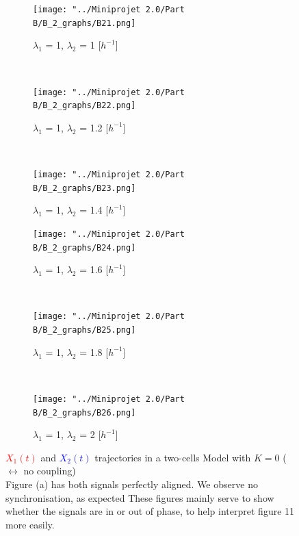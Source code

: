 \documentclass[10pt,a4paper,oneside,twocolumn]{article}
\newcommand{\red}[1]{\textcolor{red}{#1}}
\newcommand{\blue}[1]{\textcolor{blue}{#1}}
\numberwithin{equation}{section} %
\begin{document}
    \begin{figure}
    \centering
	\begin{subfigure}[b]{0.32\textwidth}
	    \texttt{[image: "../Miniprojet 2.0/Part B/B\_2\_graphs/B21.png]}
	    \caption{$\lambda_1$ = 1, $\lambda_2$ = 1 [$h^{-1}$]}
	\end{subfigure}
	~ 
	\begin{subfigure}[b]{0.32\textwidth}
	    \texttt{[image: "../Miniprojet 2.0/Part B/B\_2\_graphs/B22.png]}
	    \caption{$\lambda_1$ = 1, $\lambda_2$ = 1.2 [$h^{-1}$]}
	\end{subfigure}
	~ 
	\begin{subfigure}[b]{0.32\textwidth}
	    \texttt{[image: "../Miniprojet 2.0/Part B/B\_2\_graphs/B23.png]}
	    \caption{$\lambda_1$ = 1, $\lambda_2$ = 1.4 [$h^{-1}$]}
	\end{subfigure}
	 
	\begin{subfigure}[b]{0.32\textwidth}
	    \texttt{[image: "../Miniprojet 2.0/Part B/B\_2\_graphs/B24.png]}
	    \caption{$\lambda_1$ = 1, $\lambda_2$ = 1.6 [$h^{-1}$]}
	\end{subfigure}
	~ 
	\begin{subfigure}[b]{0.32\textwidth}
	    \texttt{[image: "../Miniprojet 2.0/Part B/B\_2\_graphs/B25.png]}
	    \caption{$\lambda_1$ = 1, $\lambda_2$ = 1.8 [$h^{-1}$]}
	\end{subfigure}
	~ 
	\begin{subfigure}[b]{0.32\textwidth}
	    \texttt{[image: "../Miniprojet 2.0/Part B/B\_2\_graphs/B26.png]}
	    \caption{$\lambda_1$ = 1, $\lambda_2$ = 2 [$h^{-1}$]}
	\end{subfigure}

	\caption{\red{$X_1(t)$} and \blue{$X_2(t)$} trajectories in a two-cells Model with $K=0$ ($\leftrightarrow$ no coupling)\\
	Figure (a) has both signals perfectly aligned. We observe no synchronisation, as expected These figures mainly serve to show whether the signals are in or out of phase, to help interpret figure 11 more easily.}
    \end{figure}
\end{document}
